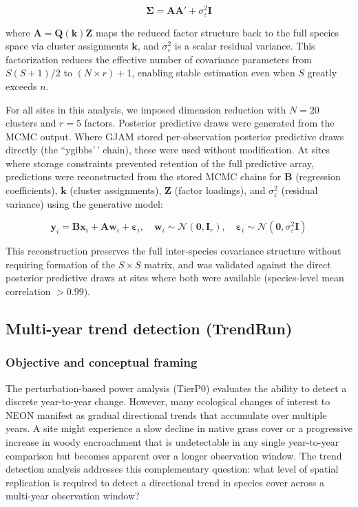 \documentclass[
  11pt,
]{article}
\begin{document}
\[
\boldsymbol{\Sigma} = \mathbf{A}\mathbf{A}' + \sigma^2_\varepsilon \mathbf{I}
\]

where \(\mathbf{A} = \mathbf{Q}(\mathbf{k})\mathbf{Z}\) maps the reduced
factor structure back to the full species space via cluster assignments
\(\mathbf{k}\), and \(\sigma^2_\varepsilon\) is a scalar residual
variance. This factorization reduces the effective number of covariance
parameters from \(S(S+1)/2\) to \((N \times r) + 1\), enabling stable
estimation even when \(S\) greatly exceeds \(n\).

For all sites in this analysis, we imposed dimension reduction with
\(N = 20\) clusters and \(r = 5\) factors. Posterior predictive draws
were generated from the MCMC output. Where GJAM stored per-observation
posterior predictive draws directly (the ``ygibbs'\,' chain), these were
used without modification. At sites where storage constraints prevented
retention of the full predictive array, predictions were reconstructed
from the stored MCMC chains for \(\mathbf{B}\) (regression
coefficients), \(\mathbf{k}\) (cluster assignments), \(\mathbf{Z}\)
(factor loadings), and \(\sigma^2_\varepsilon\) (residual variance)
using the generative model:

\[
\mathbf{y}_i = \mathbf{B}\mathbf{x}_i + \mathbf{A}\mathbf{w}_i + \boldsymbol{\varepsilon}_i, \quad \mathbf{w}_i \sim \mathcal{N}(\mathbf{0}, \mathbf{I}_r), \quad \boldsymbol{\varepsilon}_i \sim \mathcal{N}(\mathbf{0}, \sigma^2_\varepsilon \mathbf{I})
\]

This reconstruction preserves the full inter-species covariance
structure without requiring formation of the \(S \times S\) matrix, and
was validated against the direct posterior predictive draws at sites
where both were available (species-level mean correlation \(> 0.99\)).

\subsection{Multi-year trend detection
(TrendRun)}\label{multi-year-trend-detection-trendrun}

\subsubsection{Objective and conceptual
framing}\label{objective-and-conceptual-framing}

The perturbation-based power analysis (TierP0) evaluates the ability to
detect a discrete year-to-year change. However, many ecological changes
of interest to NEON manifest as gradual directional trends that
accumulate over multiple years. A site might experience a slow decline
in native grass cover or a progressive increase in woody encroachment
that is undetectable in any single year-to-year comparison but becomes
apparent over a longer observation window. The trend detection analysis
addresses this complementary question: what level of spatial replication
is required to detect a directional trend in species cover across a
multi-year observation window?
\end{document}

